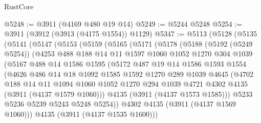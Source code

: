 \begin{lexlean}{RustCore}
\begin{coremodule}
@5248 := @3911 (@4169 @480 @19 @14)
@5249 := @5244 @5248
@5254 := @3911 (@3912 (@3913 (@4175 @1554)) @1129)
@5347 := @5113
    (@5128
      (@5135
        (@5141
          (@5147
            (@5153
              (@5159
                (@5165
                  (@5171
                    (@5178
                      (@5188
                        (@5192 (@5249 @5254))
                        (@4253
                          @488
                          @188
                          @14
                          @11
                          @1597
                          @1060
                          @1052
                          @1270
                          @304
                          @1039
                          (@5167
                            @488
                            @14
                            @1586
                            @1595
                            (@5172
                              @487
                              @19
                              @14
                              @1586
                              @1593
                              @1554
                              (@4626
                                @486
                                @14
                                @18
                                @1092
                                @1585
                                @1592
                                @1270
                                @289
                                @1039
                                @4645
                                (@4702
                                  @188
                                  @14
                                  @11
                                  @1094
                                  @1060
                                  @1052
                                  @1270
                                  @294
                                  @1039
                                  @4721
                                  @4302
                                  @4135
                                  (@3911 (@4137 @1579 @1060)))
                                @4135
                                (@3911 (@4137 @1573 @1585)))
                              @5233
                              @5236
                              @5239
                              @5243
                              @5248
                              @5254))
                          @4302
                          @4135
                          (@3911 (@4137 @1569 @1060)))
                        @4135
                        (@3911 (@4137 @1535 @1600)))

\end{coremodule}
\end{lexlean}
